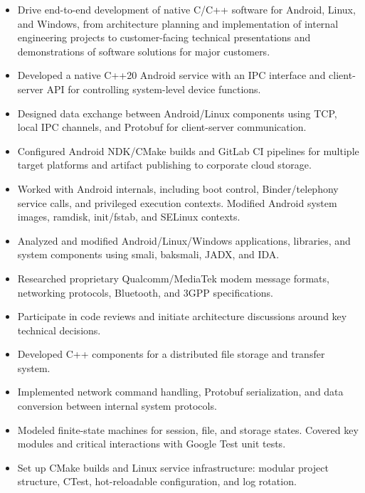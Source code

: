 \begin{itemize}
  \item Drive end-to-end development of native C/C++ software for Android, Linux, and Windows, from architecture planning and implementation of internal engineering projects to customer-facing technical presentations and demonstrations of software solutions for major customers.
  \item Developed a native C++20 Android service with an IPC interface and client-server API for controlling system-level device functions.
  \item Designed data exchange between Android/Linux components using TCP, local IPC channels, and Protobuf for client-server communication.
  \item Configured Android NDK/CMake builds and GitLab CI pipelines for multiple target platforms and artifact publishing to corporate cloud storage.
  \item Worked with Android internals, including boot control, Binder/telephony service calls, and privileged execution contexts. Modified Android system images, ramdisk, init/fstab, and SELinux contexts.
  \item Analyzed and modified Android/Linux/Windows applications, libraries, and system components using smali, baksmali, JADX, and IDA.
  \item Researched proprietary Qualcomm/MediaTek modem message formats, networking protocols, Bluetooth, and 3GPP specifications.
  \item Participate in code reviews and initiate architecture discussions around key technical decisions.
\end{itemize}

\begin{itemize}
  \item Developed C++ components for a distributed file storage and transfer system.
  \item Implemented network command handling, Protobuf serialization, and data conversion between internal system protocols.
  \item Modeled finite-state machines for session, file, and storage states. Covered key modules and critical interactions with Google Test unit tests.
  \item Set up CMake builds and Linux service infrastructure: modular project structure, CTest, hot-reloadable configuration, and log rotation.
\end{itemize}


